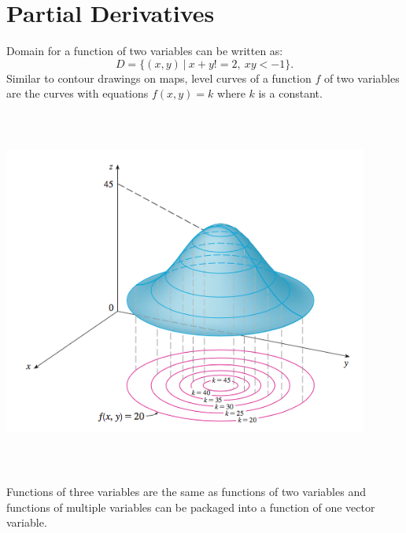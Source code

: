 \documentclass{article}
\begin{document}
\section*{Partial Derivatives}

Domain for a function of two variables can be written as: 
\[D = \{(x,y) \ | \ x + y != 2, \ xy < -1\}.\]
Similar to contour drawings on maps, level curves of a function $f$ of two variables
are the curves with equations $f(x,y) = k$ where $k$ is a constant. 
\begin{center}
    \includegraphics[width=12cm,height=12cm, keepaspectratio]{Images/LevelCurves.png}
\end{center}
Functions of three variables are the same as functions of two variables and
functions of multiple variables can be packaged into a function of one vector
variable. 
\end{document}
